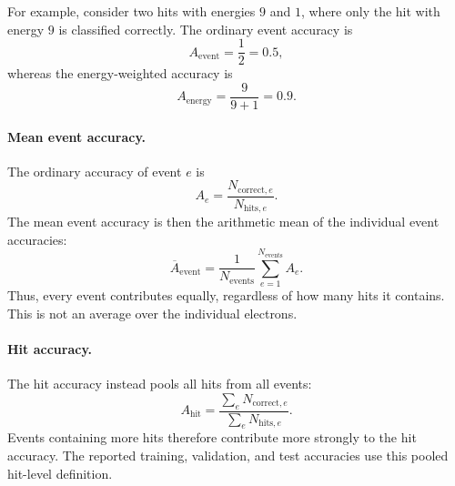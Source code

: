 For example, consider two hits with energies \(9\) and \(1\), where only the
hit with energy \(9\) is classified correctly. The ordinary event accuracy is
\[
A_{\mathrm{event}} = \frac{1}{2} = 0.5,
\]
whereas the energy-weighted accuracy is
\[
A_{\mathrm{energy}} = \frac{9}{9+1} = 0.9.
\]

\paragraph{Mean event accuracy.}
The ordinary accuracy of event \(e\) is
\[
A_e
=
\frac{N_{\mathrm{correct},e}}{N_{\mathrm{hits},e}}.
\]
The mean event accuracy is then the arithmetic mean of the individual event
accuracies:
\[
\overline{A}_{\mathrm{event}}
=
\frac{1}{N_{\mathrm{events}}}
\sum_{e=1}^{N_{\mathrm{events}}} A_e.
\]
Thus, every event contributes equally, regardless of how many hits it
contains. This is not an average over the individual electrons.

\paragraph{Hit accuracy.}
The hit accuracy instead pools all hits from all events:
\[
A_{\mathrm{hit}}
=
\frac{
    \sum_e N_{\mathrm{correct},e}
}{
    \sum_e N_{\mathrm{hits},e}
}.
\]
Events containing more hits therefore contribute more strongly to the hit
accuracy. The reported training, validation, and test accuracies use this
pooled hit-level definition.












